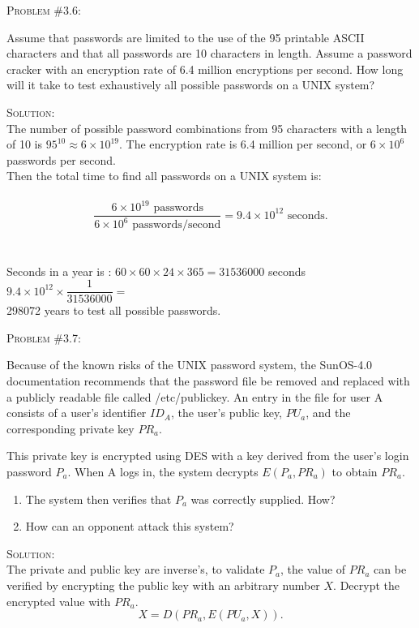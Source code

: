 \documentclass[12pt]{article}
\newenvironment{problem}[1]
{\begin{mdframed}[linewidth=0.8pt]
        \textsc{Problem #1:}

}
    {\end{mdframed}}
\newenvironment{solution}
    {\textsc{Solution:}\\}
    {\newpage}%
\begin{document}
	\begin{problem}{\#3.6}
		Assume that passwords are limited to the use of the 95 printable ASCII characters
		and that all passwords are 10 characters in length. Assume a password cracker
		with an encryption rate of 6.4 million encryptions per second. How long will
		it take to test exhaustively all possible passwords on a UNIX system?
	\end{problem}
	\begin{solution}
		The number of possible password combinations from 95 characters with a length of 10
		is $95^{10} \approx 6\times 10^{19}$. The encryption rate is 6.4 million per second,
		or $6\times 10^6$ passwords per second.\\
		Then the total time to find all passwords on a UNIX system is:\\
		\\
		\[	
		\dfrac{6\times 10^{19} \text{\ passwords}}{6\times 10^6 \text{\ passwords/second}}
		= 9.4\times 10^{12} \text{\ seconds}
	.\]
		\\
		\\
		Seconds in a year is : $60 \times 60\times 24\times 365 =31536000 $ seconds
		$9.4\times 10^{12}\times \dfrac{1}{31536000} = $\\ 298072 years to test all possible passwords.
	\end{solution}


	\begin{problem}{\#3.7}
		Because of the known risks of the UNIX password system, the SunOS-4.0
		documentation recommends that the password file be removed and replaced with
		a publicly readable file called /etc/publickey. An entry in the file for user
		A consists of a user's identifier $ID_A$, the user's public key,
		$PU_a$, and the corresponding private key $PR_a$.

		This private key is encrypted using DES with a key derived from the user's
		login password $P_a$. When A logs in, the system decrypts $E\left( P_a, PR_a \right) $ 
		to obtain $PR_a$.
		\begin{enumerate}[label=\alph*]
			\item The system then verifies that $P_a$ was correctly supplied. How?
			\item How can an opponent attack this system?
		\end{enumerate}
	\end{problem}
	\begin{solution}
		The private and public key are inverse's, to validate $P_a$, the value of $PR_a$
		can be verified by encrypting the public key with an arbitrary number  $X$.
		Decrypt the encrypted value with $PR_a$.\\
		 \[
			 X = D\left( PR_a, E\left( PU_a,X \right)  \right) 
		.\] 
	\end{solution}
\end{document}
